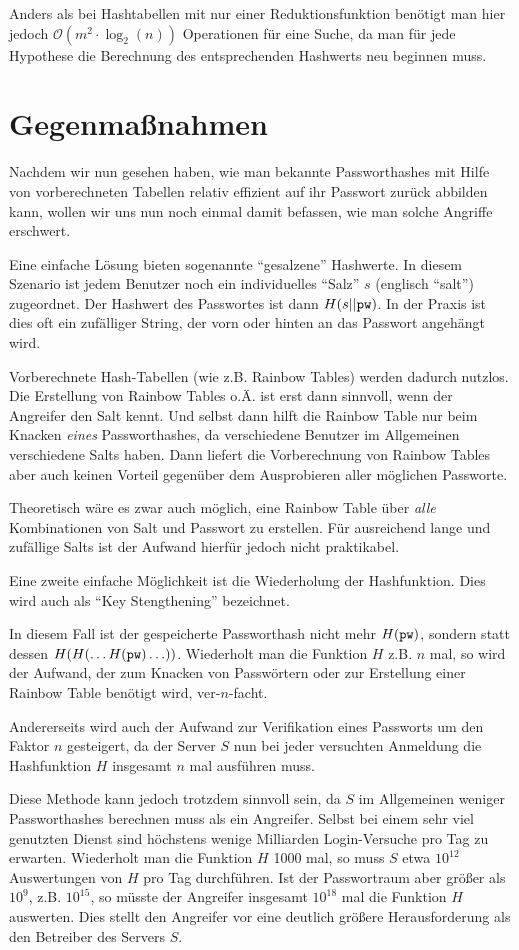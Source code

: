 Anders als bei Hashtabellen mit nur einer Reduktionsfunktion benötigt
man hier jedoch $\mathcal{O}(m^2 \cdot \log_2(n))$ Operationen für eine
Suche, da man für jede Hypothese die Berechnung des entsprechenden
Hashwerts neu beginnen muss.

\section{Gegenmaßnahmen}


Nachdem wir nun gesehen haben, wie man bekannte Passworthashes mit Hilfe
von vorberechneten Tabellen relativ effizient auf ihr Passwort zurück
abbilden kann, wollen wir uns nun noch einmal damit befassen, wie man
solche Angriffe erschwert.

Eine einfache Lösung bieten sogenannte "`gesalzene"' Hashwerte. In
diesem Szenario ist jedem Benutzer noch ein individuelles "`Salz"' $s$
(englisch "`salt"') zugeordnet. Der Hashwert des Passwortes ist dann
$H(s || \texttt{pw})$. In der Praxis ist dies oft ein zufälliger String, der vorn
oder hinten an das Passwort angehängt wird.

Vorberechnete Hash-Tabellen (wie z.B. Rainbow Tables)
werden dadurch nutzlos. Die Erstellung von Rainbow Tables o.Ä. ist erst
dann sinnvoll, wenn der Angreifer den Salt kennt. Und selbst dann hilft
die Rainbow Table nur beim Knacken \emph{eines} Passworthashes, da
verschiedene Benutzer im Allgemeinen verschiedene Salts haben. Dann
liefert die Vorberechnung von Rainbow Tables aber auch keinen Vorteil
gegenüber dem Ausprobieren aller möglichen Passworte.


Theoretisch wäre es zwar auch möglich, eine Rainbow Table über
\emph{alle} Kombinationen von Salt und Passwort zu erstellen. Für
ausreichend lange und zufällige Salts ist der Aufwand hierfür jedoch
nicht praktikabel.

Eine zweite einfache Möglichkeit ist die Wiederholung der
Hashfunktion. Dies wird auch als "`Key Stengthening"' bezeichnet.

In diesem Fall ist der gespeicherte Passworthash nicht mehr $H(\texttt{pw})$,
sondern statt dessen $H(H(\ldots H(\texttt{pw})\ldots))$. Wiederholt man die Funktion $H$
z.B. $n$ mal, so wird der Aufwand, der zum Knacken von Passwörtern oder
zur Erstellung einer Rainbow Table benötigt wird, ver-$n$-facht.

Andererseits wird auch der Aufwand zur Verifikation eines Passworts um
den Faktor $n$ gesteigert, da der Server $S$ nun bei jeder versuchten
Anmeldung die Hashfunktion $H$ insgesamt $n$ mal ausführen muss.

Diese Methode kann jedoch trotzdem sinnvoll sein, da $S$ im Allgemeinen
weniger Passworthashes berechnen muss als ein Angreifer. Selbst bei
einem sehr viel genutzten Dienst sind höchstens wenige Milliarden
Login-Versuche pro Tag zu erwarten. Wiederholt man die Funktion $H$ 1000
mal, so muss $S$ etwa $10^{12}$ Auswertungen von $H$ pro Tag
durchführen. Ist der Passwortraum aber größer als $10^9$,
z.B. $10^{15}$, so müsste der Angreifer insgesamt $10^{18}$ mal die
Funktion $H$ auswerten. Dies stellt den Angreifer vor eine deutlich
größere Herausforderung als den Betreiber des Servers $S$.
